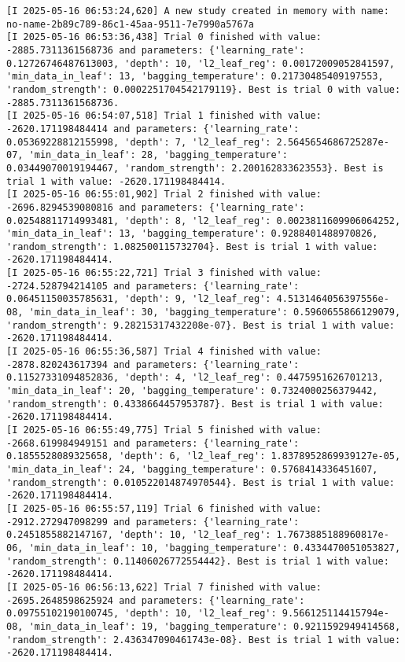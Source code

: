 \documentclass[
  letterpaper,
  DIV=11,
  numbers=noendperiod]{scrreprt}
\begin{document}
\begin{verbatim}
[I 2025-05-16 06:53:24,620] A new study created in memory with name: no-name-2b89c789-86c1-45aa-9511-7e7990a5767a
[I 2025-05-16 06:53:36,438] Trial 0 finished with value: -2885.7311361568736 and parameters: {'learning_rate': 0.12726746487613003, 'depth': 10, 'l2_leaf_reg': 0.00172009052841597, 'min_data_in_leaf': 13, 'bagging_temperature': 0.21730485409197553, 'random_strength': 0.0002251704542179119}. Best is trial 0 with value: -2885.7311361568736.
[I 2025-05-16 06:54:07,518] Trial 1 finished with value: -2620.171198484414 and parameters: {'learning_rate': 0.05369228812155998, 'depth': 7, 'l2_leaf_reg': 2.5645654686725287e-07, 'min_data_in_leaf': 28, 'bagging_temperature': 0.03449070019194467, 'random_strength': 2.200162833623553}. Best is trial 1 with value: -2620.171198484414.
[I 2025-05-16 06:55:01,902] Trial 2 finished with value: -2696.8294539080816 and parameters: {'learning_rate': 0.02548811714993481, 'depth': 8, 'l2_leaf_reg': 0.0023811609906064252, 'min_data_in_leaf': 13, 'bagging_temperature': 0.9288401488970826, 'random_strength': 1.082500115732704}. Best is trial 1 with value: -2620.171198484414.
[I 2025-05-16 06:55:22,721] Trial 3 finished with value: -2724.528794214105 and parameters: {'learning_rate': 0.06451150035785631, 'depth': 9, 'l2_leaf_reg': 4.5131464056397556e-08, 'min_data_in_leaf': 30, 'bagging_temperature': 0.5960655866129079, 'random_strength': 9.28215317432208e-07}. Best is trial 1 with value: -2620.171198484414.
[I 2025-05-16 06:55:36,587] Trial 4 finished with value: -2878.820243617394 and parameters: {'learning_rate': 0.11527331094852836, 'depth': 4, 'l2_leaf_reg': 0.4475951626701213, 'min_data_in_leaf': 20, 'bagging_temperature': 0.7324000256379442, 'random_strength': 0.4338664457953787}. Best is trial 1 with value: -2620.171198484414.
[I 2025-05-16 06:55:49,775] Trial 5 finished with value: -2668.619984949151 and parameters: {'learning_rate': 0.1855528089325658, 'depth': 6, 'l2_leaf_reg': 1.8378952869939127e-05, 'min_data_in_leaf': 24, 'bagging_temperature': 0.5768414336451607, 'random_strength': 0.010522014874970544}. Best is trial 1 with value: -2620.171198484414.
[I 2025-05-16 06:55:57,119] Trial 6 finished with value: -2912.272947098299 and parameters: {'learning_rate': 0.2451855882147167, 'depth': 10, 'l2_leaf_reg': 1.7673885188960817e-06, 'min_data_in_leaf': 10, 'bagging_temperature': 0.4334470051053827, 'random_strength': 0.11406026772554442}. Best is trial 1 with value: -2620.171198484414.
[I 2025-05-16 06:56:13,622] Trial 7 finished with value: -2695.2648598625924 and parameters: {'learning_rate': 0.09755102190100745, 'depth': 10, 'l2_leaf_reg': 9.566125114415794e-08, 'min_data_in_leaf': 19, 'bagging_temperature': 0.9211592949414568, 'random_strength': 2.436347090461743e-08}. Best is trial 1 with value: -2620.171198484414.

\end{verbatim}
\end{document}
